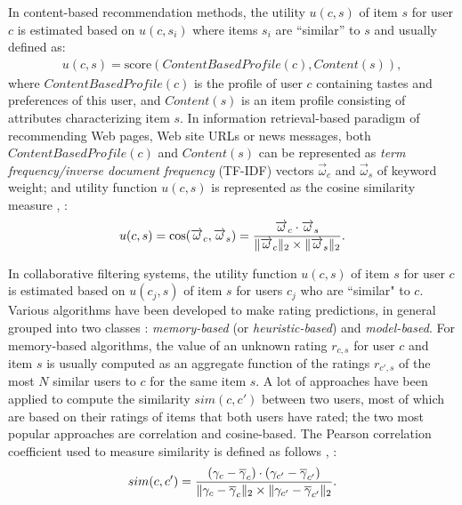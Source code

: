 \documentclass[letterpaper,twocolumn,10pt]{article}
\DeclarePairedDelimiter{\norm}{\lVert}{\rVert}
\begin{document}
 In content-based recommendation methods, the utility $u(c, s)$ of item $s$  for user $c$ is estimated based on $u(c, s_i)$ where items $s_i$ are ``similar'' to $s$ and usually defined as:
 \begin{align*}
  u(c, s) = \text{score}(ContentBasedProfile(c), Content(s)),
  \end{align*}
 where $ ContentBasedProfile(c)$ is the profile of user $c$ containing tastes and preferences of this user,  and $ Content(s)$ is an item profile consisting of attributes characterizing item $s$. 
 In information retrieval-based paradigm of recommending Web pages, Web site URLs or news messages, both $ ContentBasedProfile(c)$ and $ Content(s)$ can be represented as \textit{term frequency/inverse document frequency} \cite{S89}  (TF-IDF) vectors $\overrightarrow{\omega}_c$ and $\overrightarrow{\omega}_s$ of keyword weight; and utility function $u(c, s)$ is represented as the cosine similarity measure \cite{BYRN99}, \cite{S89}:
\begin{align}
 u(c, s) = \cos(\overrightarrow{\omega}_c, \overrightarrow{\omega}_s) = \frac{\overrightarrow{\omega}_c\cdot \overrightarrow{\omega}_s}{\norm{\overrightarrow{\omega}_c}_2\times \norm{\overrightarrow{\omega}_s}_2}.
 \end{align}



In collaborative filtering systems, the utility function $u(c, s)$ of item $s$ for user $c$ is estimated based on $u(c_j, s)$ of item $s$ for users $c_j$ who are ``similar" to $c$.
Various algorithms have been developed to make rating predictions, in general grouped into two classes  \cite{BHK98}:  \textit{memory-based} (or \textit{heuristic-based}) and \textit{model-based}.
For memory-based algorithms, the value of an unknown rating $r_{c,s}$ for user $c$ and item $s$ is usually computed as an aggregate function of the ratings $r_{c',s}$   of the most $N$ similar users to $c$ for the same item $s$. A lot of approaches have been applied to compute the similarity $sim(c, c') $ between two users, most of which are based on their ratings of items that both users have rated; the two most popular approaches are correlation and cosine-based.  The Pearson correlation coefficient  used to measure similarity  is defined as follows \cite{RISBR94}, \cite{SM95}:
\begin{align}
 sim(c, c') = \frac{ (\gamma_c-\overline{\gamma}_{c}) \cdot (\gamma_{c'}-\overline{\gamma}_{c'}) }{\norm{\gamma_c-\overline{\gamma}_{c}}_2\times \norm{\gamma_{c'}-\overline{\gamma}_{c'}}_2}.\end{align}
\end{document}

